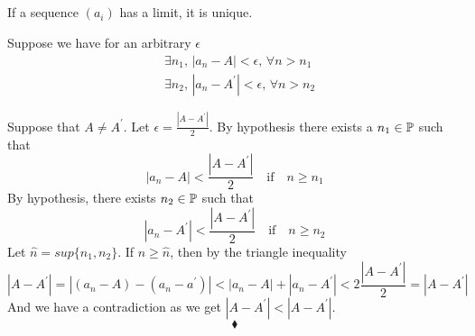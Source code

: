 \subsection{}
\begin{tcolorbox}
If a sequence $(a_i)$ has a limit, it is unique.
\end{tcolorbox}
Suppose we have for an arbitrary $\epsilon$
\begin{align*}
&\exists n_1,\, |a_n-A|<\epsilon,\, \forall n>n_1\\
&\exists n_2,\, |a_n-A^{'}|<\epsilon,\, \forall n>n_2
\end{align*}

Suppose that $A \neq A^{'}$. Let $\epsilon = \frac{|A - A^{'}|}{2} $. By hypothesis there exists a $n_1 \in \mathbb{P}$ such that 
$$
|a_n - A| <\frac{|A - A^{'}|}{2} \quad \text{if} \quad n \geq n_1 
$$ 
By hypothesis, there exists $n_2 \in \mathbb{P}$ such that 
$$
|a_n - A^{'}|<\frac{|A - A^{'}|}{2} \quad \text{if} \quad n \geq n_2 
$$
Let $\hat{n} = sup\{n_1,n_2\}$. If $n \geq \hat{n}$, then by the triangle inequality
$$
|A - A^{'}| = |(a_n - A) - (a_n - a^{'})| <|a_ n - A| + |a_n - A^{'}| < 2 \frac{|A - A^{'}|}{2} = |A - A^{'}|
$$
And we have a contradiction as we get $
|A - A^{'}| <|A - A^{'}|
$.
$$\blacklozenge$$
\newpage


\renewcommand{\thesubsection}{\thesection.\arabic{subsection}}
\setcounter{subsection}{0}
